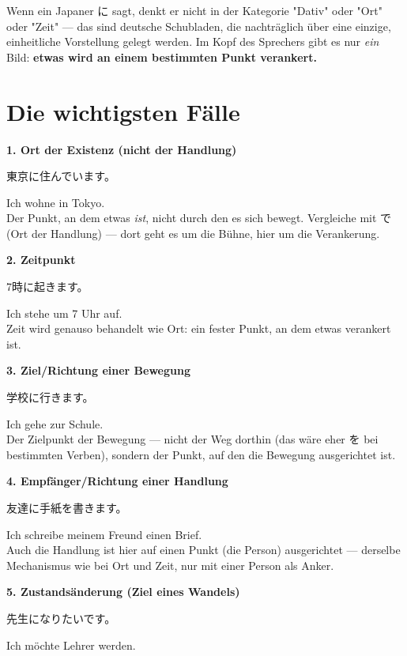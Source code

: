 \documentclass[12pt]{book}
\begin{document}
Wenn ein Japaner に sagt, denkt er nicht in der Kategorie "Dativ" oder "Ort" oder "Zeit" — das sind deutsche Schubladen, die nachträglich über eine einzige, einheitliche Vorstellung gelegt werden. Im Kopf des Sprechers gibt es nur \emph{ein} Bild: \textbf{etwas wird an einem bestimmten Punkt verankert.}

\section*{Die wichtigsten Fälle}

\textbf{1. Ort der Existenz (nicht der Handlung)}
\par\quad 東京に住んでいます。\\
\par\quad Ich wohne in Tokyo.\\

Der Punkt, an dem etwas \emph{ist}, nicht durch den es sich bewegt. Vergleiche mit で (Ort der Handlung) — dort geht es um die Bühne, hier um die Verankerung.

\textbf{2. Zeitpunkt}
\par\quad 7時に起きます。\\
\par\quad Ich stehe um 7 Uhr auf.\\

Zeit wird genauso behandelt wie Ort: ein fester Punkt, an dem etwas verankert ist.

\textbf{3. Ziel/Richtung einer Bewegung}
\par\quad 学校に行きます。\\
\par\quad Ich gehe zur Schule.\\

Der Zielpunkt der Bewegung — nicht der Weg dorthin (das wäre eher を bei bestimmten Verben), sondern der Punkt, auf den die Bewegung ausgerichtet ist.

\textbf{4. Empfänger/Richtung einer Handlung}
\par\quad 友達に手紙を書きます。\\
\par\quad Ich schreibe meinem Freund einen Brief.\\

Auch die Handlung ist hier auf einen Punkt (die Person) ausgerichtet — derselbe Mechanismus wie bei Ort und Zeit, nur mit einer Person als Anker.

\textbf{5. Zustandsänderung (Ziel eines Wandels)}
\par\quad 先生になりたいです。\\
\par\quad Ich möchte Lehrer werden.\\
\end{document}
